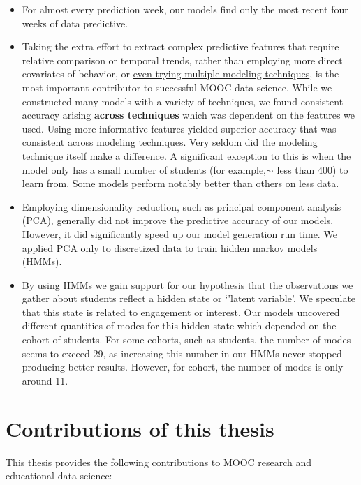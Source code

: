 \begin{itemize}
\item For almost every prediction week, our models find only the most recent four weeks of data predictive.

\item Taking the extra effort to extract complex predictive features that require relative comparison or temporal trends, rather than employing more direct covariates of behavior, or \underline{even trying multiple modeling techniques}, is the most important contributor to successful MOOC data science. While we constructed many models with a variety of techniques, we found consistent accuracy arising \textbf{across techniques} which was dependent on the features we used. Using more informative features yielded superior accuracy that was consistent across modeling techniques. Very seldom did the modeling technique itself make a difference. A significant exception to this is when the model only has a small number of students (for example,$\sim$ less than 400) to learn from. Some models perform notably better than others on less data.

\item Employing dimensionality reduction, such as principal component analysis (PCA), generally did not improve the predictive accuracy of our models. However, it did significantly speed up our model generation run time. We applied PCA only to discretized data to train hidden markov models (HMMs).

\item By using HMMs we gain support for our hypothesis that the observations we gather about students reflect a hidden state or `'latent variable'. We speculate that this state is related to engagement or interest. Our models uncovered different quantities of modes for this hidden state which depended on the cohort of students. For some cohorts, such as \neither students, the number of modes seems to exceed 29, as increasing this number in our HMMs never stopped producing better results. However, for \forum cohort, the number of modes is only around 11.
\end{itemize}

\section{Contributions of this thesis}
This thesis provides the following contributions to MOOC research and educational data science:

